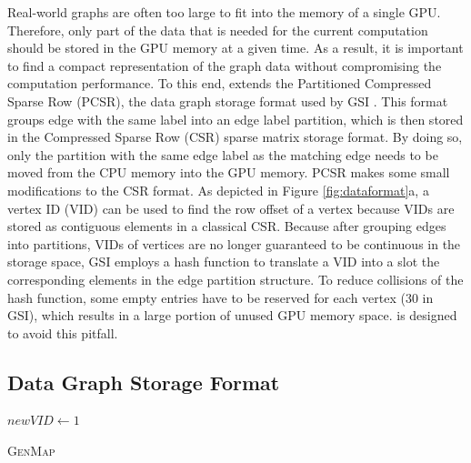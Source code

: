 Real-world graphs are often too large to fit into the memory of a single GPU. Therefore, only part of the data that is needed for the
current computation should be stored in the GPU memory at a given time. As a result, it is important to find a compact representation of
the graph data without compromising the computation performance. To this end, \SystemName extends the Partitioned Compressed Sparse Row
(PCSR), the data graph storage format used by GSI \cite{zeng2020gsi}. This format groups edge with the same label into an edge label partition,
which is then stored in the Compressed Sparse Row (CSR) sparse matrix storage format. By doing so, only the partition with
the same edge label as the matching edge needs to be moved from the CPU memory into the GPU memory. PCSR makes some small modifications to
the CSR format. As depicted in Figure \ref{fig:dataformat}a, a vertex ID (VID) can be used to find the row offset of a vertex because VIDs are stored
as contiguous elements in a classical CSR. Because after grouping edges into partitions, VIDs of vertices are no longer guaranteed to be
continuous in the storage space, GSI employs a hash function to translate a VID into a slot the corresponding elements in the edge partition structure. To reduce collisions of the hash function, some empty entries have to be reserved
for each vertex (30 in GSI), which results in a large portion of unused GPU memory space. \SystemName is designed to avoid this pitfall.


\subsection{\SystemName Data Graph Storage Format}

\begin{algorithm}[t!]
$newVID \leftarrow 1$\;
\caption{\textsc{GenMap}}
\label{algo:genmap}
\end{algorithm}

